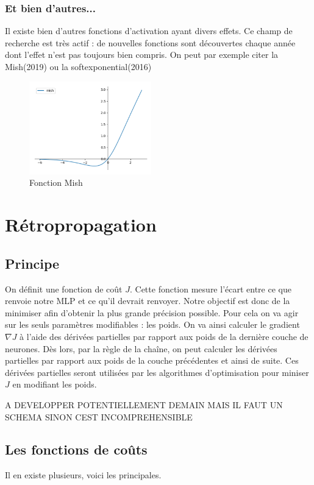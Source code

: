 \subsubsection{Et bien d'autres...}
Il existe bien d'autres fonctions d'activation ayant divers effets. Ce champ de recherche est très actif : de nouvelles fonctions sont découvertes chaque année dont l'effet n'est pas toujours bien compris. On peut par exemple citer la Mish(2019)\cite{Mish} ou la softexponential(2016)\cite{Softexponential}
\begin{figure}[!h]
\centering
\includegraphics[width=150pt]{"images/MLP/mish2"}
\caption{Fonction Mish}
\label{Mish}
\end{figure}


\section{Rétropropagation}
\subsection{Principe}

On définit une fonction de coût $J$. Cette fonction mesure l'écart entre ce que renvoie notre MLP et ce qu'il devrait renvoyer. Notre objectif est donc de la minimiser afin d'obtenir la plus grande précision possible. Pour cela on va agir sur les seuls paramètres modifiables : les poids. On va ainsi calculer le gradient $\nabla J$ à l'aide des dérivées partielles par rapport aux poids de la dernière couche de neurones. Dès lors, par la règle de la chaîne, on peut calculer les dérivées partielles par rapport aux poids de la couche précédentes et ainsi de suite. Ces dérivées partielles seront utilisées par les algorithmes d'optimisation pour miniser $J$ en modifiant les poids.
 	
A DEVELOPPER POTENTIELLEMENT DEMAIN MAIS IL FAUT UN SCHEMA SINON CEST INCOMPREHENSIBLE

\subsection{Les fonctions de coûts}
Il en existe plusieurs, voici les principales.

